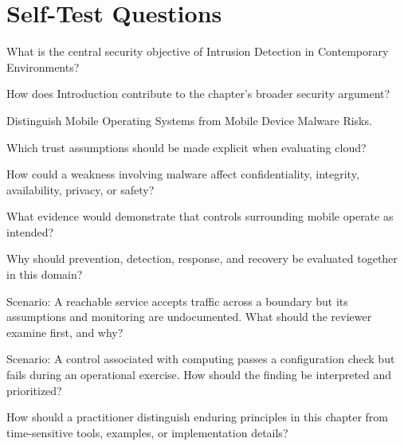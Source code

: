 \documentclass[11pt,letterpaper]{article}
\begin{document}
\section*{Self-Test Questions}
\begin{CornellRecallList}
\item What is the central security objective of Intrusion Detection in Contemporary Environments?
\item How does Introduction contribute to the chapter's broader security argument?
\item Distinguish Mobile Operating Systems from Mobile Device Malware Risks.
\item Which trust assumptions should be made explicit when evaluating cloud?
\item How could a weakness involving malware affect confidentiality, integrity, availability, privacy, or safety?
\item What evidence would demonstrate that controls surrounding mobile operate as intended?
\item Why should prevention, detection, response, and recovery be evaluated together in this domain?
\item Scenario: A reachable service accepts traffic across a boundary but its assumptions and monitoring are undocumented. What should the reviewer examine first, and why?
\item Scenario: A control associated with computing passes a configuration check but fails during an operational exercise. How should the finding be interpreted and prioritized?
\item How should a practitioner distinguish enduring principles in this chapter from time-sensitive tools, examples, or implementation details?
\end{CornellRecallList}
\end{document}
